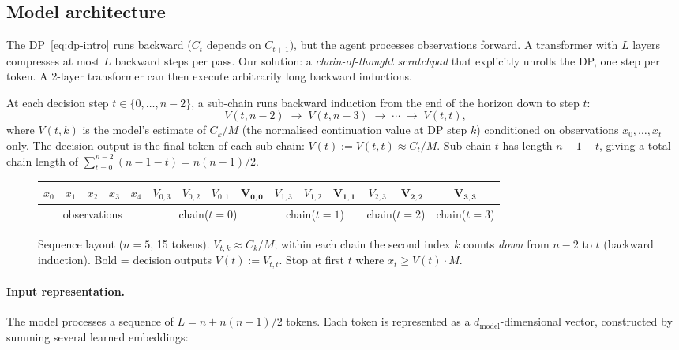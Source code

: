 \documentclass{article}
\begin{document}
\subsection{Model architecture}

The DP~\eqref{eq:dp-intro} runs backward ($C_t$ depends on $C_{t+1}$), but the agent processes observations forward. A transformer with $L$ layers compresses at most $L$ backward steps per pass. Our solution: a \emph{chain-of-thought scratchpad} that explicitly unrolls the DP, one step per token. A 2-layer transformer can then execute arbitrarily long backward inductions.

At each decision step $t \in \{0, \ldots, n{-}2\}$, a sub-chain runs backward induction from the end of the horizon down to step $t$:
\[
  V(t, n{-}2) \;\to\; V(t, n{-}3) \;\to\; \cdots \;\to\; V(t, t),
\]
where $V(t,k)$ is the model's estimate of $C_k/M$ (the normalised continuation value at DP step $k$) conditioned on observations $x_0, \ldots, x_t$ only. The decision output is the final token of each sub-chain: $V(t) := V(t,t) \approx C_t/M$. Sub-chain $t$ has length $n{-}1{-}t$, giving a total chain length of $\sum_{t=0}^{n-2}(n{-}1{-}t) = n(n{-}1)/2$.

\begin{figure}[h]
\centering
\footnotesize
\setlength{\tabcolsep}{2.5pt}
\begin{tabular}{|c|c|c|c|c||c|c|c|c||c|c|c||c|c||c|}
\hline
$x_0$ & $x_1$ & $x_2$ & $x_3$ & $x_4$ &
$V_{0,3}$ & $V_{0,2}$ & $V_{0,1}$ & $\mathbf{V_{0,0}}$ &
$V_{1,3}$ & $V_{1,2}$ & $\mathbf{V_{1,1}}$ &
$V_{2,3}$ & $\mathbf{V_{2,2}}$ &
$\mathbf{V_{3,3}}$ \\
\hline
\multicolumn{5}{|c||}{observations} & \multicolumn{4}{c||}{chain($t{=}0$)} & \multicolumn{3}{c||}{chain($t{=}1$)} & \multicolumn{2}{c||}{chain($t{=}2$)} & chain($t{=}3$) \\
\hline
\end{tabular}
\caption{Sequence layout ($n = 5$, 15 tokens). $V_{t,k} \approx C_k/M$; within each chain the second index $k$ counts \emph{down} from $n{-}2$ to $t$ (backward induction). Bold = decision outputs $V(t) := V_{t,t}$. Stop at first $t$ where $x_t \ge V(t) \cdot M$.}
\label{fig:layout}
\end{figure}

\paragraph{Input representation.}
The model processes a sequence of $L = n + n(n{-}1)/2$ tokens. Each token is represented as a $d_{\mathrm{model}}$-dimensional vector, constructed by summing several learned embeddings:
\end{document}
